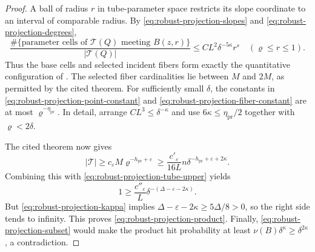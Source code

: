 \begin{proof}
A ball of radius $r$ in tube-parameter space restricts its slope
coordinate to an interval of comparable radius. By
\eqref{eq:robust-projection-slopes} and
\eqref{eq:robust-projection-degrees},
\begin{equation}\label{eq:robust-projection-fiber-constant}
 \frac{\#\{\text{parameter cells of }\mathcal T(Q)
                     \text{ meeting }B(z,r)\}}
      {|\mathcal T(Q)|}
 \le CL^2\delta^{-5\kappa}r^s
 \quad(\varrho\le r\le1).
\end{equation}
Thus the base cells and selected incident fibers form exactly
the quantitative configuration of
\citet[Definition~3.1 and Theorem~4.1]{RW2025}. The selected fiber
cardinalities lie between $M$ and $2M$, as
permitted by the cited theorem. For sufficiently small $\delta$, the
constants in \eqref{eq:robust-projection-point-constant} and
\eqref{eq:robust-projection-fiber-constant} are at most
$\varrho^{-\eta_{\mathrm{pr}}}$. In detail, arrange $CL^3\le\delta^{-\kappa}$
and use $6\kappa\le\eta_{\mathrm{pr}}/2$ together with
$\varrho<2\delta$.

The cited theorem now gives
\[
 |\mathcal T|\ge c_\varepsilon M\varrho^{-h_{\mathrm{pr}}+\varepsilon}
 \ge\frac{c'_\varepsilon}{16L}
             n\delta^{-h_{\mathrm{pr}}+\varepsilon+2\kappa}.
\]
Combining this with \eqref{eq:robust-projection-tube-upper} yields
\[
 1\ge\frac{c''_\varepsilon}{L}
             \delta^{-(\Delta-\varepsilon-2\kappa)}.
\]
But \eqref{eq:robust-projection-kappa} implies
$\Delta-\varepsilon-2\kappa\ge5\Delta/8>0$, so the right
side tends to infinity. This proves
\eqref{eq:robust-projection-product}.
Finally, \eqref{eq:robust-projection-subset} would make the product
hit probability at least $\nu(B)\delta^\kappa\ge\delta^{2\kappa}$,
a contradiction.
\end{proof}

